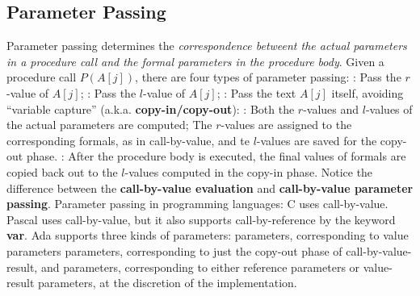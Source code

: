 \documentclass{article}
\begin{document}
\eit

\subsection{Parameter Passing}
\bit
\w Parameter passing determines the {\em{}correspondence
	betweent the actual parameters in a procedure call
	and the formal parameters in the procedure body\/}.
\w Given a procedure call $P(A[j])$, there are four types of
	parameter passing:
	\ben
	: Pass the $r$-value of $A[j]$;
	: Pass the $l$-value of $A[j]$;
	: Pass the text $A[j]$ itself, avoiding
		``variable capture''
	 (a.k.a. {\bf{}copy-in/copy-out}): 
		\ben
		: Both the $r$-values and
			$l$-values of the actual parameters are computed;
			The $r$-values are assigned to the corresponding 
			formals, as in call-by-value, and te $l$-values are 
			saved for the copy-out phase.
		:
			After the procedure body is executed, the final
			values of formals are copied back out to the 
			$l$-values computed in the copy-in phase.
		\een
	\een
\w Notice the difference between the {\bf{}call-by-value
	evaluation} and {\bf{}call-by-value parameter passing}.
\w Parameter passing in programming languages:
	\bit
	\w C uses call-by-value.
	\w Pascal uses call-by-value, but it also supports 
		call-by-reference by the keyword {\bf{}var}.
	\w Ada supports three kinds of parameters:
		\bit
		 parameters, corresponding to value parameters
		 parameters, corresponding to just
			the copy-out phase of call-by-value-result, and
		 parameters, corresponding to either
			reference parameters or value-result parameters,
			at the discretion of the implementation.
		\eit
	\eit
\eit
\end{document}
